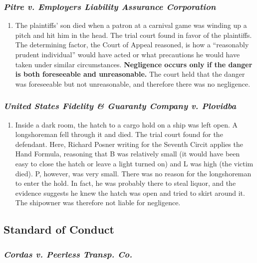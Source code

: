 \subsubsection{\emph{Pitre v. Employers Liability Assurance Corporation}}

\begin{enumerate}
    \item The plaintiffs' son died when a patron at a carnival game was winding up a pitch and hit him in the head. The trial court found in favor of the plaintiffs. The determining factor, the Court of Appeal reasoned, is how a ``reasonably prudent individual'' would have acted or what precautions he would have taken under similar circumstances. \textbf{Negligence occurs only if the danger is both foreseeable and unreasonable.} The court held that the danger was foreseeable but not unreasonable, and therefore there was no negligence.
\end{enumerate}

\subsubsection{\emph{United States Fidelity \& Guaranty Company v. Plovidba}}

\begin{enumerate}
    \item Inside a dark room, the hatch to a cargo hold on a ship was left open. A longshoreman fell through it and died. The trial court found for the defendant. Here, Richard Posner writing for the Seventh Circit applies the Hand Formula, reasoning that B was relatively small (it would have been easy to close the hatch or leave a light turned on) and L was high (the victim died). P, however, was very small. There was no reason for the longshoreman to enter the hold. In fact, he was probably there to steal liquor, and the evidence suggests he knew the hatch was open and tried to skirt around it. The shipowner was therefore not liable for negligence.
\end{enumerate}

\subsection{Standard of Conduct}

\subsubsection{\emph{Cordas v. Peerless Transp. Co.}}


